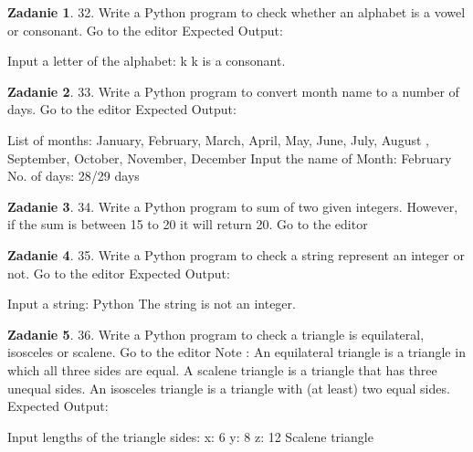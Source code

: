 \documentclass[11pt]{article}
\theoremstyle{definition}
\newtheorem{zadanie}{Zadanie}
\begin{document}
\begin{zadanie}


32. Write a Python program to check whether an alphabet is a vowel or consonant. Go to the editor
Expected Output:

Input a letter of the alphabet: k                                       
k is a consonant.



\end{zadanie}

\begin{zadanie}


33. Write a Python program to convert month name to a number of days. Go to the editor
Expected Output:

List of months: January, February, March, April, May, June, July, August
, September, October, November, December                                
Input the name of Month: February                                       
No. of days: 28/29 days 



\end{zadanie}

\begin{zadanie}


34. Write a Python program to sum of two given integers. However, if the sum is between 15 to 20 it will return 20. Go to the editor



\end{zadanie}

\begin{zadanie}


35. Write a Python program to check a string represent an integer or not. Go to the editor
Expected Output:

Input a string: Python                                                  
The string is not an integer.  



\end{zadanie}

\begin{zadanie}


36. Write a Python program to check a triangle is equilateral, isosceles or scalene. Go to the editor
Note :
An equilateral triangle is a triangle in which all three sides are equal.
A scalene triangle is a triangle that has three unequal sides.
An isosceles triangle is a triangle with (at least) two equal sides.
Expected Output:

Input lengths of the triangle sides:                                    
x: 6                                                                    
y: 8                                                                    
z: 12                                                                   
Scalene triangle  



\end{zadanie}
\end{document}

